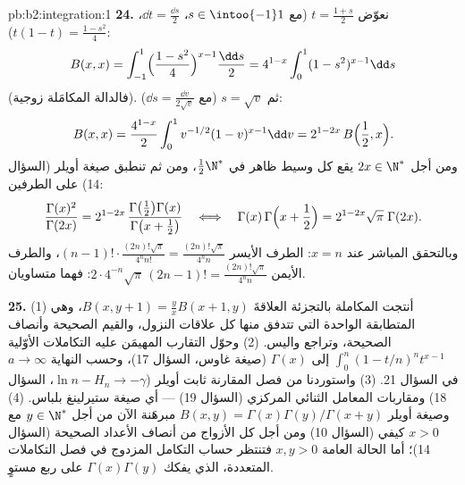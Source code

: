 \begin{solution}{pb:b2:integration:1}
\textbf{24.} نعوّض $t = \frac{1+s}2$ (مع $s \in
\intoo{-1}1$، $\dd t = \frac{\dd s}2$، $t(1-t) =
\frac{1-s^2}4$):
\[
B(x,x) = \int_{-1}^{1}\Bigl(\frac{1-s^2}{4}\Bigr)^{x-1}
\frac{\dd s}{2}
= 4^{1-x}\int_0^1 (1-s^2)^{x-1}\dd s
\]
(فالدالة المكامَلة زوجية). ثم $s = \sqrt v$ (مع $\dd s =
\frac{\dd v}{2\sqrt v}$):
\[
B(x,x) = \frac{4^{1-x}}{2}\int_0^1
v^{-1/2}(1-v)^{x-1}\dd v
= 2^{1-2x}\,B\Bigl(\frac12, x\Bigr) .
\]
ومن أجل $2x \in \N^*$ يقع كل وسيط ظاهر في
$\frac12\N^*$، ومن ثم تنطبق صيغة أويلر (السؤال 14) على الطرفين:
\[
\frac{\Gamma(x)^2}{\Gamma(2x)}
= 2^{1-2x}\,
\frac{\Gamma\bigl(\frac12\bigr)\Gamma(x)}
{\Gamma\bigl(x+\frac12\bigr)}
\quad\Longleftrightarrow\quad
\Gamma(x)\,\Gamma\Bigl(x+\frac12\Bigr)
= 2^{1-2x}\sqrt\pi\;\Gamma(2x) .
\]
وبالتحقق المباشر عند $x = n$: الطرف الأيسر $(n-1)!\cdot
\frac{(2n)!\sqrt\pi}{4^n n!} = \frac{(2n)!\sqrt\pi}{4^n n}$،
والطرف الأيمن $2\cdot4^{-n}\sqrt\pi\,(2n-1)! =
\frac{(2n)!\sqrt\pi}{4^n n}$: فهما متساويان.

\textbf{25.} (1) أنتجت المكاملة بالتجزئة العلاقةَ $B(x,y+1) =
\frac yx B(x+1,y)$، وهي المتطابقة الواحدة التي تتدفق منها كل
علاقات النزول، والقيم الصحيحة وأنصاف الصحيحة، وتراجع
واليس. (2) وحوّل التقارب المهيمَن عليه
التكاملات الأوّلية $\int_0^n(1-t/n)^n t^{x-1}$ إلى
$\Gamma(x)$ (صيغة غاوس، السؤال 17)، وحسب
النهاية $a \to \infty$ في السؤال 21. (3) واستوردنا من فصل
المقارنة ثابت أويلر ($\ln n - H_n \to
-\gamma$، السؤال 18) ومقاربات المعامل الثنائي المركزي
(السؤال 19) --- أي صيغة ستيرلينغ بلباس. (4)
وصيغة أويلر $B(x,y) = \Gamma(x)\Gamma(y)/\Gamma(x+y)$
مبرهَنة الآن من أجل $y \in \N^*$ مع $x > 0$ كيفي (السؤال
10) ومن أجل كل الأزواج من أنصاف الأعداد الصحيحة (السؤال 14)؛ أما الحالة
العامة $x, y > 0$ فتنتظر حساب التكامل المزدوج في
فصل التكاملات المتعددة، الذي يفكك
$\Gamma(x)\Gamma(y)$ على ربع مستوٍ.
\end{solution}
